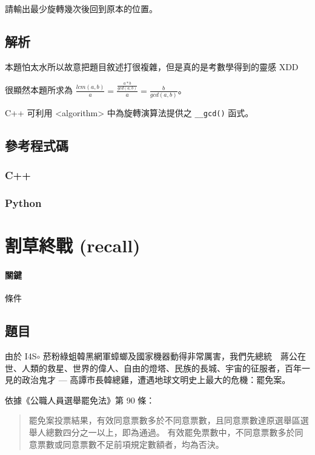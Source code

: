 \documentclass[a4paper,10pt]{article}
\begin{document}
請輸出最少旋轉幾次後回到原本的位置。

\subsection{解析}

本題怕太水所以故意把題目敘述打很複雜，但是真的是考數學得到的靈感 XDD

很顯然本題所求為 $ \frac{lcm(a, b)}{a} = \frac{\frac{a * b}{gcd(a, b)}}{a} = \frac{b}{gcd(a, b)} $。

C++ 可利用 <algorithm> 中為旋轉演算法提供之 \texttt{\_\_gcd()} 函式。

\subsection{參考程式碼}

\subsubsection{C++}



\subsubsection{Python}



\section{割草終戰 (recall)}

\paragraph{關鍵} 條件

\subsection{題目}

由於 I4S$\circ$ 菸粉綠蛆韓黑網軍蟑螂及國家機器動得非常厲害，我們先總統　蔣公在世、人類的救星、世界的偉人、自由的燈塔、民族的長城、宇宙的征服者，百年一見的政治鬼才 --- 高譚市長韓總雞，遭遇地球文明史上最大的危機：罷免案。

依據《公職人員選舉罷免法》第 90 條：
\begin{quote}
罷免案投票結果，有效同意票數多於不同意票數，且同意票數達原選舉區選舉人總數四分之一以上，即為通過。
有效罷免票數中，不同意票數多於同意票數或同意票數不足前項規定數額者，均為否決。
\end{quote}
\end{document}
